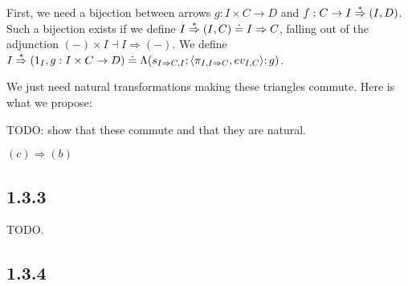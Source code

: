 \documentclass{article}
\begin{document}
First, we need a bijection between arrows $g : I \times C \to D$ and $f : C \to I \overset{\ast}{\Rightarrow} (I,D)$.
Such a bijection exists if we define $I \overset{\ast}{\Rightarrow} (I,C) \doteq I \Rightarrow C$, falling
out of the adjunction $(-) \times I \dashv I \Rightarrow (-)$.
We define $I \overset{\ast}{\Rightarrow} (1_I, g : I \times C \to D) \doteq \Lambda(s_{I \Rightarrow C, I};\langle \pi_{I,I \Rightarrow C}, ev_{I,C}\rangle;g)$.
\begin{center}
\end{center}

We just need natural transformations making these triangles commute. Here is what we propose:

\begin{center}
\end{center}

TODO: show that these commute and that they are natural.

$(c) \Rightarrow (b)$

\subsection*{1.3.3}

TODO.

\subsection*{1.3.4}
\end{document}
